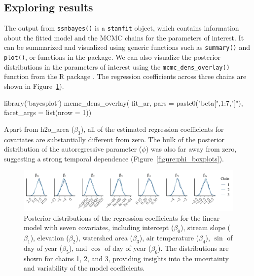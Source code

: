 \subsection{Exploring results}

The output from \texttt{ssnbayes()} is a \texttt{stanfit} object, which contains information about the fitted model and the MCMC chains for the parameters of interest. It can be summarized and visualized using generic functions such as \texttt{summary()} and \texttt{plot()}, or functions in the  package. We can also visualize the posterior distributions in the parameters of interest using the \texttt{mcmc\_dens\_overlay()} function from the R package  \citep{bayesplot}.
The regression coefficients across three chains are shown in Figure~\ref{figure:beta_dens}).

\begin{example}
library('bayesplot')
mcmc_dens_overlay(
  fit_ar,
  pars = paste0("beta[",1:7,"]"),
  facet_args = list(nrow = 1))
\end{example}


Apart from h2o\_area ($\beta_3$), all of the estimated regression coefficients for covariates are substantially different from zero. The bulk of the posterior distribution of the autoregressive parameter ($\phi$) was also far away from zero, suggesting a strong temporal dependence (Figure~\ref{figure:phi_boxplots}). 


\begin{figure}[htbp]
  \centering
   \includegraphics[width=5.6in]{./Figs_Pay/beta_dens.pdf}
  \caption{
  Posterior distributions of the regression coefficients for the linear model with seven covariates, including intercept ($\beta_0$), stream slope ($\beta_1$), elevation ($\beta_2$), watershed area ($\beta_3$), air temperature ($\beta_4$), $\sin$ of day of year ($\beta_5$), and $\cos$ of day of year ($\beta_6$). The distributions are shown for chains 1, 2, and 3, providing insights into the uncertainty and variability of the model coefficients.
  }
  \label{figure:beta_dens}
\end{figure}



